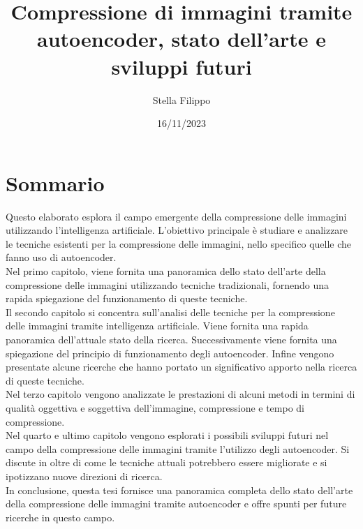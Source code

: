 \documentclass[12pt,a4paper,twoside,openright]{extreport}
\title{Compressione di immagini tramite autoencoder, stato dell’arte e sviluppi futuri}
\author{Stella Filippo}
\date{16/11/2023}
\begin{document}
    \pagestyle{empty} %

    
    \cleardoublepage
    
    
    \cleardoublepage

    \pagestyle{plain} %

    \setcounter{page}{1}
    \chapter*{Sommario}
    Questo elaborato esplora il campo emergente della compressione delle immagini utilizzando l'intelligenza artificiale. L’obiettivo principale è studiare e analizzare le tecniche esistenti per la compressione delle immagini, nello specifico quelle che fanno uso di autoencoder.\\
    Nel primo capitolo, viene fornita una panoramica dello stato dell’arte della compressione delle immagini utilizzando tecniche tradizionali, fornendo una rapida spiegazione del funzionamento di queste tecniche.\\
    Il secondo capitolo si concentra sull’analisi delle tecniche per la compressione delle immagini tramite intelligenza artificiale. Viene fornita una rapida panoramica dell'attuale stato della ricerca. Successivamente viene fornita una spiegazione del principio di funzionamento degli autoencoder. Infine vengono presentate alcune ricerche che hanno portato un significativo apporto nella ricerca di queste tecniche.\\
    Nel terzo capitolo vengono analizzate le prestazioni di alcuni metodi in termini di qualità oggettiva e soggettiva dell'immagine, compressione e tempo di compressione.\\ 
    Nel quarto e ultimo capitolo vengono esplorati i possibili sviluppi futuri nel campo della compressione delle immagini tramite l'utilizzo degli autoencoder. Si discute in oltre di come le tecniche attuali potrebbero essere migliorate e si ipotizzano nuove direzioni di ricerca.\\
    In conclusione, questa tesi fornisce una panoramica completa dello stato dell’arte della compressione delle immagini tramite autoencoder e offre spunti per future ricerche in questo campo.\\

    \cleardoublepage

    \tableofcontents
    \cleardoublepage
    
    \listoffigures
    \cleardoublepage 

    \setcounter{figure}{0} %
    
    
    
    
    
    
    
    \cleardoublepage

    \printbibliography[heading=bibintoc]
\end{document}
